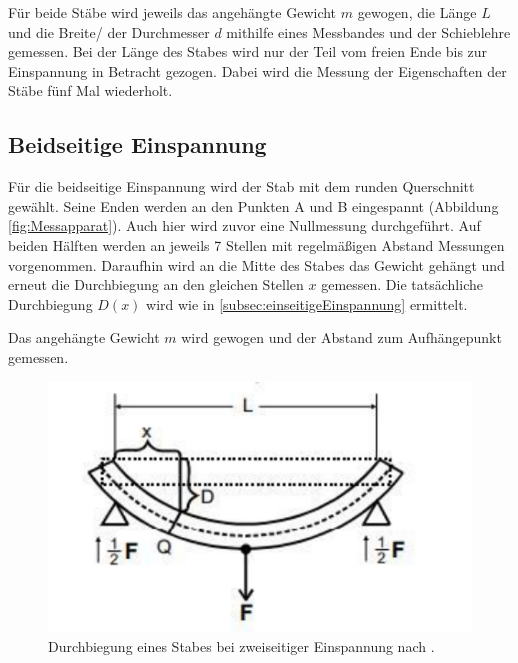Für beide Stäbe wird jeweils das angehängte Gewicht $m$ gewogen, die Länge $L$ und die Breite/ der Durchmesser $d$ mithilfe eines Messbandes und der Schieblehre gemessen.
Bei der Länge des Stabes wird nur der Teil vom freien Ende bis zur Einspannung in Betracht gezogen.
Dabei wird die Messung der Eigenschaften der Stäbe fünf Mal wiederholt.

\subsection{Beidseitige Einspannung}
Für die beidseitige Einspannung wird der Stab mit dem runden Querschnitt gewählt.
Seine Enden werden an den Punkten A und B eingespannt (Abbildung \ref{fig:Messapparat}).
Auch hier wird zuvor eine Nullmessung durchgeführt.
Auf beiden Hälften werden an jeweils 7 Stellen mit regelmäßigen Abstand Messungen vorgenommen.
Daraufhin wird an die Mitte des Stabes das Gewicht gehängt und erneut die Durchbiegung an den gleichen Stellen $x$ gemessen.
Die tatsächliche Durchbiegung $D(x)$ wird wie in \ref{subsec:einseitigeEinspannung} ermittelt.

Das angehängte Gewicht $m$ wird gewogen und der Abstand zum Aufhängepunkt gemessen.

\begin{figure}
    \centering
    \includegraphics[width=\textwidth]{zweiseitig.pdf}
    \caption{Durchbiegung eines Stabes bei zweiseitiger Einspannung nach \cite{anleitung}.} 
\end{figure}